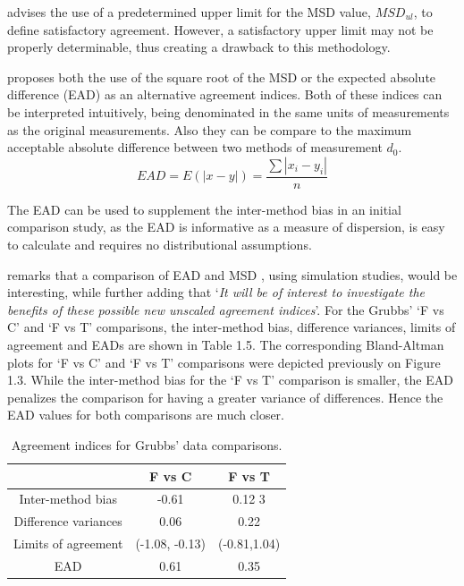 \documentclass[12pt, a4paper]{report}
\theoremstyle{plain}
\theoremstyle{definition}
\theoremstyle{remark}
\begin{document}
	
	\citet{Barnhart} advises the use of a predetermined upper limit
	for the MSD value, $MSD_{ul}$, to define satisfactory agreement.
	However, a satisfactory upper limit may not be properly
	determinable, thus creating a drawback to this methodology.
	
	
	\citet{Barnhart} proposes both the use of the square root of the
	MSD or the expected absolute difference (EAD) as an alternative agreement indices. Both of these indices can be interpreted intuitively, being denominated in the same units of measurements as the original
	measurements. Also they can be compare to the maximum acceptable
	absolute difference between two methods of measurement $d_{0}$.
	\[
	EAD = E(|x - y|) = \frac{\sum |x_{i}- y_{i}|}{n}
	\]
	
	The EAD can be used to supplement the inter-method bias in an
	initial comparison study, as the EAD is informative as a measure
	of dispersion, is easy to calculate and requires no distributional
	assumptions.
	
	\citet{Barnhart} remarks that a comparison of EAD and MSD , using
	simulation studies, would be interesting, while further adding
	that `\textit{It will be of interest to investigate the benefits of these
	possible new unscaled agreement indices}'. For the Grubbs' `F vs C' and `F vs T' comparisons, the inter-method bias, difference variances, limits of agreement and EADs are shown
	in Table 1.5. The corresponding Bland-Altman plots for `F vs C' and `F vs T' comparisons were depicted previously on Figure 1.3. While the inter-method bias for the `F vs T' comparison is smaller, the EAD penalizes the comparison for having a greater variance of differences. Hence the EAD values for both comparisons are much closer.
	\begin{table}[ht]
		\begin{center}
			\begin{tabular}{|c|c|c|}
				\hline
				& F vs C & F vs T  \\
				\hline
				Inter-method bias & -0.61 & 0.12 3 \\
				Difference variances & 0.06 & 0.22  \\
				Limits of agreement & (-1.08,	-0.13) & (-0.81,1.04) \\
				EAD & 0.61 & 0.35  \\
				\hline
			\end{tabular}
			\caption{Agreement indices for Grubbs' data comparisons.}
		\end{center}
	\end{table}
	
\end{document}
